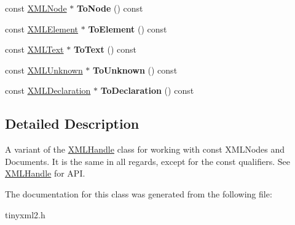 \begin{DoxyCompactItemize}
const \mbox{\hyperlink{classtinyxml2_1_1_x_m_l_node}{X\+M\+L\+Node}} $\ast$ {\bfseries To\+Node} () const
\item 
\mbox{\label{classtinyxml2_1_1_x_m_l_const_handle_a4dba53c6e201d412e915620feaaa56f3}} 
const \mbox{\hyperlink{classtinyxml2_1_1_x_m_l_element}{X\+M\+L\+Element}} $\ast$ {\bfseries To\+Element} () const
\item 
\mbox{\label{classtinyxml2_1_1_x_m_l_const_handle_a80e24d90d476005aa35602a665358e2d}} 
const \mbox{\hyperlink{classtinyxml2_1_1_x_m_l_text}{X\+M\+L\+Text}} $\ast$ {\bfseries To\+Text} () const
\item 
\mbox{\label{classtinyxml2_1_1_x_m_l_const_handle_a4395e5feaba7b456a81ca274880ea3d3}} 
const \mbox{\hyperlink{classtinyxml2_1_1_x_m_l_unknown}{X\+M\+L\+Unknown}} $\ast$ {\bfseries To\+Unknown} () const
\item 
\mbox{\label{classtinyxml2_1_1_x_m_l_const_handle_a55e306d105fa80d626041e4d3b77b716}} 
const \mbox{\hyperlink{classtinyxml2_1_1_x_m_l_declaration}{X\+M\+L\+Declaration}} $\ast$ {\bfseries To\+Declaration} () const
\end{DoxyCompactItemize}


\subsection{Detailed Description}
A variant of the \mbox{\hyperlink{classtinyxml2_1_1_x_m_l_handle}{X\+M\+L\+Handle}} class for working with const X\+M\+L\+Nodes and Documents. It is the same in all regards, except for the \textquotesingle{}const\textquotesingle{} qualifiers. See \mbox{\hyperlink{classtinyxml2_1_1_x_m_l_handle}{X\+M\+L\+Handle}} for A\+PI. 

The documentation for this class was generated from the following file\+:\begin{DoxyCompactItemize}
\item 
tinyxml2.\+h\end{DoxyCompactItemize}
